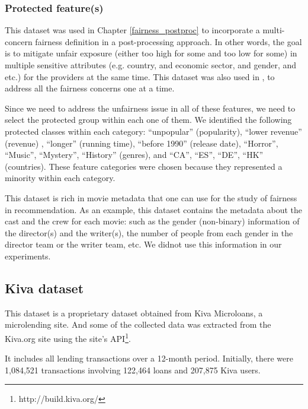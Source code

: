         \subsubsection{Protected feature(s)}

        This dataset was used in Chapter \ref{fairness_postproc}  to incorporate a multi-concern fairness definition in a post-processing approach. In other words, the goal is to mitigate unfair exposure (either too high for some and too low for some) in multiple sensitive attributes (e.g. country, and economic sector, and gender, and etc.) for the providers at the same time. This dataset was also used in , to address all the fairness concerns one at a time.
    
        Since we need to address the unfairness issue in all of these features, we need to select the protected group within each one of them.
        We identified the following protected classes within each category: ``unpopular'' (popularity), ``lower revenue'' (revenue) , ``longer'' (running time), ``before 1990'' (release date), ``Horror'', ``Music'', ``Mystery'', ``History'' (genres), and ``CA'', ``ES'', ``DE'', ``HK'' (countries). These feature categories were chosen because they represented a minority within each category.
    
        This dataset is rich in movie metadata that one can use for the study of fairness in recommendation. As an example, this dataset contains the metadata about the cast and the crew for each movie: such as the gender (non-binary) information of the director(s) and the writer(s), the number of people from each gender in the director team or the writer team, etc. We didnot use this information in our experiments.

    \subsection{Kiva dataset}
    This dataset is a proprietary dataset obtained from Kiva Microloans, a microlending site. And some of the collected data was extracted from the Kiva.org site using the site's API\footnote{http://build.kiva.org/}.
    
    It includes all lending transactions over a 12-month period. Initially, there were 1,084,521 transactions involving 122,464 loans and 207,875 Kiva users.
    
